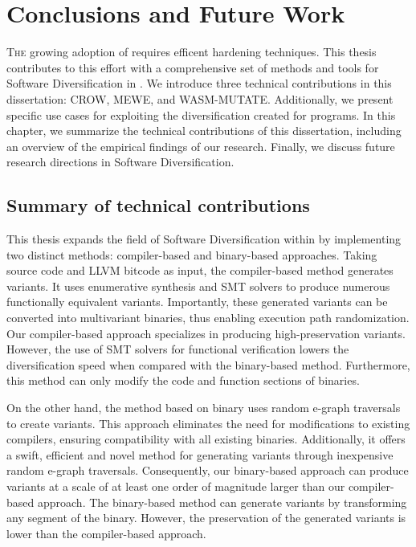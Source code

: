 
\chapter{Conclusions and Future Work}
\label{results}


\lettrine[lines=3]{T}{he} growing adoption of \Wasm requires efficent hardening techniques.
This thesis contributes to this effort with a comprehensive set of methods and tools for Software Diversification in \Wasm.
We introduce three technical contributions in this dissertation: CROW, MEWE, and WASM-MUTATE.
Additionally, we present specific use cases for exploiting the diversification created for \Wasm programs.
In this chapter, we summarize the technical contributions of this dissertation, including an overview of the empirical findings of our research.
Finally, we discuss future research directions in \Wasm Software Diversification.

\section{Summary of technical contributions}


This thesis expands the field of Software Diversification within \Wasm by implementing two distinct methods: compiler-based and binary-based approaches. 
Taking source code and LLVM bitcode as input, the compiler-based method generates \Wasm variants.
It uses enumerative synthesis and SMT solvers to produce numerous functionally equivalent variants. 
Importantly, these generated variants can be converted into multivariant binaries, thus enabling execution path randomization. 
Our compiler-based approach specializes in producing high-preservation variants.
However, the use of SMT solvers for functional verification lowers the diversification speed when compared with the binary-based method. 
Furthermore, this method can only modify the code and function sections of \Wasm binaries.

On the other hand, the method based on binary uses random e-graph traversals to create variants. 
This approach eliminates the need for modifications to existing compilers, ensuring compatibility with all existing \Wasm binaries. 
Additionally, it offers a swift, efficient and novel method for generating variants through inexpensive random e-graph traversals. 
Consequently, our binary-based approach can produce variants at a scale of at least one order of magnitude larger than our compiler-based approach. 
The binary-based method can generate variants by transforming any segment of the \wasm binary.
However, the preservation of the generated variants is lower than the compiler-based approach.

